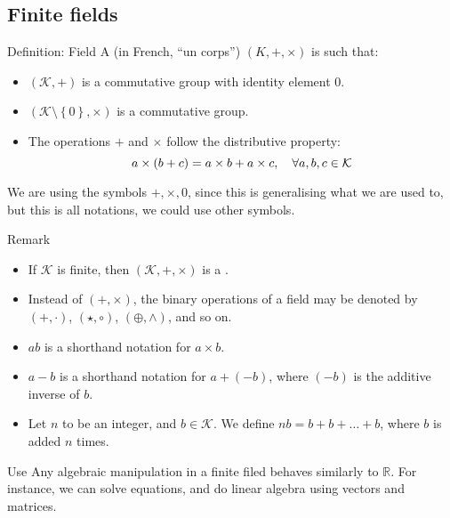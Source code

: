 \documentclass[a4paper]{article}
\begin{document}
\subsection{Finite fields}
\begin{parag}{Definition: Field}
    A  (in French, ``un corps'') $\left(K, +, \times\right)$ is such that:
    \begin{itemize}
        \item $\left(\mathcal{K}, +\right)$ is a commutative group with identity element $0$.
        \item $\left(\mathcal{K} \setminus \left\{0\right\}, \times\right)$ is a commutative group.
        \item The operations $+$ and $\times$ follow the distributive property:
            \[a \times\left(b + c\right)= a \times b + a \times c, \mathspace \forall a, b, c \in \mathcal{K}\]
    \end{itemize}

    We are using the symbols $+, \times, 0$, since this is generalising what we are used to, but this is all notations, we could use other symbols.

    \begin{subparag}{Remark}
        \begin{itemize}[left=0pt]
            \item If $\mathcal{K}$ is finite, then $\left(\mathcal{K}, +, \times\right)$ is a .
            \item Instead of $\left(+, \times\right)$, the binary operations of a field may be denoted by $\left(+, \cdot\right)$, $\left(\star, \circ\right)$, $\left(\oplus, \land\right)$, and so on.
            \item $ab$ is a shorthand notation for $a \times b$.
            \item $a - b$ is a shorthand notation for $a + \left(-b\right)$, where $\left(-b\right)$ is the additive inverse of $b$.
            \item Let $n$ to be an integer, and $b \in \mathcal{K}$. We define $nb = b + b + \ldots + b$, where $b$ is added $n$ times.
        \end{itemize}
    \end{subparag}

    \begin{subparag}{Use}
        Any algebraic manipulation in a finite filed behaves similarly to $\mathbb{R}$. For instance, we can solve equations, and do linear algebra using vectors and matrices.
    \end{subparag}
    
\end{parag}
\end{document}
